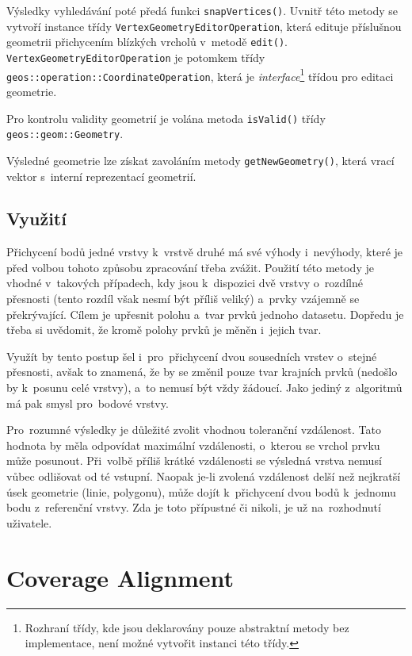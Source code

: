 Výsledky vyhledávání poté předá funkci \texttt{snap\-Vertices()}. 
Uvnitř této metody se vytvoří instance  třídy 
\texttt{Vertex\-Geometry\-Editor\-Operation}, která edituje příslušnou 
geo\-metrii přichycením blízkých vrcholů v~metodě \texttt{edit()}. 
\texttt{Vertex\-Geometry\-Editor\-Operation} je potomkem třídy 
\texttt{geos::\-operation::\-Coordinate\-Operation}, která je 
\textit{inter\-face}\footnote{Rozhraní třídy, kde jsou deklarovány 
pouze abstraktní metody bez implementace, není možné vytvořit 
instanci této třídy.} třídou pro editaci geometrie.

Pro kontrolu validity geometrií je volána metoda \texttt{isValid()} 
třídy \texttt{geos::geom::\-Geometry}.

Výsledné geometrie lze získat zavoláním metody \texttt{getNewGeometry()},
která vrací vektor s~interní reprezentací geometrií.



\subsection{Využití}
\label{vs-vyuziti}

Přichycení bodů jedné vrstvy k~vrstvě druhé má své výhody i~nevýhody, které 
je před volbou tohoto způsobu zpracování třeba zvážit. Použití této metody 
je vhodné v~takových případech, kdy jsou k~dispozici dvě vrstvy o~rozdílné 
přesnosti (tento rozdíl však nesmí být příliš veliký) a~prvky vzájemně se 
překrývající. Cílem je upřesnit polohu a~tvar prvků jednoho datasetu. 
Dopředu je třeba si uvědomit, že kromě polohy prvků je měněn i~jejich tvar.

Využít by tento postup šel i~pro~přichycení dvou sousedních vrstev o~stejné 
přesnosti, avšak to znamená, že by se změnil pouze tvar krajních prvků 
(nedošlo by k~posunu celé vrstvy), a~to nemusí být vždy žádoucí. Jako jediný
z~algoritmů  má pak smysl pro~bodové vrstvy.

Pro~rozumné výsledky je důležité zvolit vhodnou toleranční vzdálenost. Tato 
hodnota by měla odpovídat maximální vzdálenosti, o~kterou se vrchol prvku 
může posunout. Při~volbě příliš krátké vzdálenosti se výsledná vrstva nemusí 
vůbec odlišovat od té vstupní. Naopak \mbox{je-li} zvolená vzdálenost delší 
než nejkratší úsek geometrie (linie, polygonu), může dojít k~přichycení dvou 
bodů k~jednomu bodu z~referenční vrstvy. Zda je toto přípustné či nikoli, je 
už na~rozhodnutí uživatele.


\section{Coverage Alignment} 
\label{coverage alignment}

